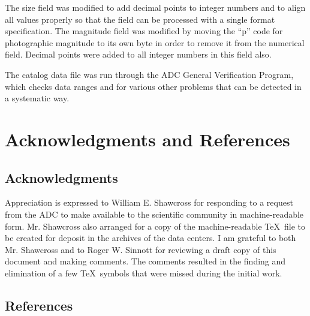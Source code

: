 The size field was modified to add decimal points to integer numbers and to
align all values properly so that the field can be processed with a single
format specification. The magnitude field was modified by moving the ``p'' code
for photographic magnitude to its own byte in order to remove it from the
numerical field. Decimal points were added to all integer numbers in this field
also.

The catalog data file was run through the ADC General Verification Program,
which checks data ranges and for various other problems that can be detected in
a systematic way.

\section{Acknowledgments and References}

\subsection{Acknowledgments}

Appreciation is expressed to William E. Shawcross for responding to a request
from the ADC to make {\em \cat} available to the scientific community in
machine-readable form. Mr. Shawcross also arranged for a copy of the
machine-readable \TeX\ file to be created for deposit in the archives of the
data centers. I am grateful to both Mr. Shawcross and to Roger W. Sinnott for
reviewing a draft copy of this document and making comments. The comments
resulted in the finding and elimination of a few \TeX\ symbols that were missed
during the initial work.

\subsection{References}

